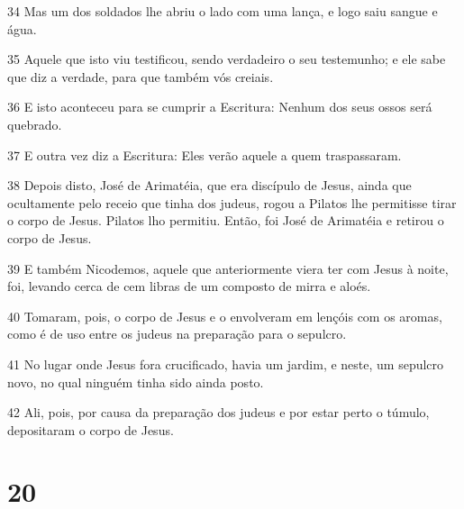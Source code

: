 \par 34 Mas um dos soldados lhe abriu o lado com uma lança, e logo saiu sangue e água.
\par 35 Aquele que isto viu testificou, sendo verdadeiro o seu testemunho; e ele sabe que diz a verdade, para que também vós creiais.
\par 36 E isto aconteceu para se cumprir a Escritura: Nenhum dos seus ossos será quebrado.
\par 37 E outra vez diz a Escritura: Eles verão aquele a quem traspassaram.
\par 38 Depois disto, José de Arimatéia, que era discípulo de Jesus, ainda que ocultamente pelo receio que tinha dos judeus, rogou a Pilatos lhe permitisse tirar o corpo de Jesus. Pilatos lho permitiu. Então, foi José de Arimatéia e retirou o corpo de Jesus.
\par 39 E também Nicodemos, aquele que anteriormente viera ter com Jesus à noite, foi, levando cerca de cem libras de um composto de mirra e aloés.
\par 40 Tomaram, pois, o corpo de Jesus e o envolveram em lençóis com os aromas, como é de uso entre os judeus na preparação para o sepulcro.
\par 41 No lugar onde Jesus fora crucificado, havia um jardim, e neste, um sepulcro novo, no qual ninguém tinha sido ainda posto.
\par 42 Ali, pois, por causa da preparação dos judeus e por estar perto o túmulo, depositaram o corpo de Jesus.

\chapter{20}

